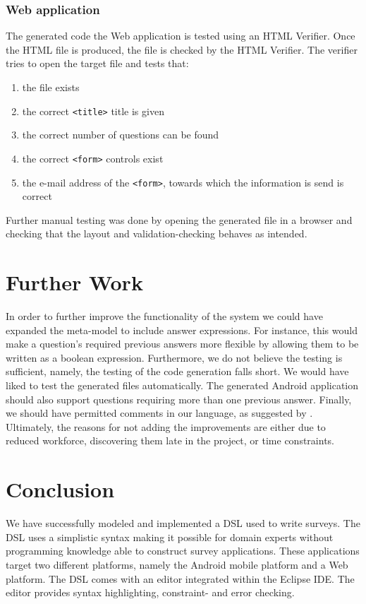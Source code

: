 \documentclass[runningheads]{llncs}
\begin{document}
\subsubsection{Web application}
The generated code the Web application is tested using an HTML Verifier. Once the HTML file is produced, the file is checked by the HTML Verifier. The verifier tries to open the target file and tests that:
\begin{enumerate}
\item the file exists
\item the correct \texttt{<title>} title is given
\item the correct number of questions can be found
\item the correct \texttt{<form>} controls exist
\item the e-mail address of the \texttt{<form>}, towards which the information is send is correct
\end{enumerate}
Further manual testing was done by opening the generated file in a browser and checking that the layout and validation-checking behaves as intended.

\section{Further Work}
In order to further improve the functionality of the system we could have expanded the meta-model to include answer expressions. For instance, this would make a question's required previous answers more flexible by allowing them to be written as a boolean expression. Furthermore, we do not believe the testing is sufficient, namely, the testing of the code generation falls short. We would have liked to test the generated files automatically. The generated Android application should also support questions requiring more than one previous answer. Finally, we should have permitted comments in our language, as suggested by \cite{karsai}. Ultimately, the reasons for not adding the improvements are either due to reduced workforce, discovering them late in the project, or time constraints.

\section{Conclusion}
We have successfully modeled and implemented a DSL used to write surveys. 
The DSL uses a simplistic syntax making it possible for domain experts without programming knowledge able to construct survey applications. 
These applications target two different platforms, namely the Android mobile platform and a Web platform. The DSL comes with an editor integrated within the Eclipse IDE. The editor provides syntax highlighting, constraint- and error checking.
\end{document}
